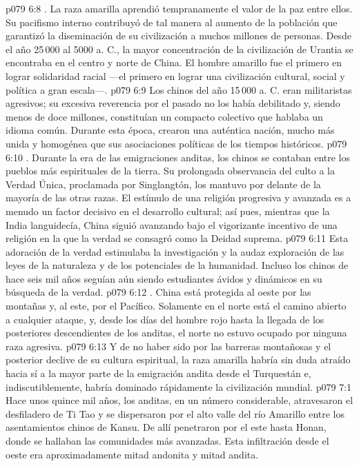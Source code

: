 \vs p079 6:8 . La raza amarilla aprendió tempranamente el valor de la paz entre ellos. Su pacifismo interno contribuyó de tal manera al aumento de la población que garantizó la diseminación de su civilización a muchos millones de personas. Desde el año 25\,000 al 5000 a. C., la mayor concentración de la civilización de Urantia se encontraba en el centro y norte de China. El hombre amarillo fue el primero en lograr solidaridad racial ---el primero en lograr una civilización cultural, social y política a gran escala---.
\vs p079 6:9 Los chinos del año 15\,000 a. C. eran militaristas agresivos; su excesiva reverencia por el pasado no los había debilitado y, siendo menos de doce millones, constituían un compacto colectivo que hablaba un idioma común. Durante esta época, crearon una auténtica nación, mucho más unida y homogénea que sus asociaciones políticas de los tiempos históricos.
\vs p079 6:10 . Durante la era de las emigraciones anditas, los chinos se contaban entre los pueblos más espirituales de la tierra. Su prolongada observancia del culto a la Verdad Única, proclamada por Singlangtón, los mantuvo por delante de la mayoría de las otras razas. El estímulo de una religión progresiva y avanzada es a menudo un factor decisivo en el desarrollo cultural; así pues, mientras que la India languidecía, China siguió avanzando bajo el vigorizante incentivo de una religión en la que la verdad se consagró como la Deidad suprema.
\vs p079 6:11 Esta adoración de la verdad estimulaba la investigación y la audaz exploración de las leyes de la naturaleza y de los potenciales de la humanidad. Incluso los chinos de hace seis mil años seguían aún siendo estudiantes ávidos y dinámicos en su búsqueda de la verdad.
\vs p079 6:12 . China está protegida al oeste por las montañas y, al este, por el Pacífico. Solamente en el norte está el camino abierto a cualquier ataque, y, desde los días del hombre rojo hasta la llegada de los posteriores descendientes de los anditas, el norte no estuvo ocupado por ninguna raza agresiva.
\vs p079 6:13 Y de no haber sido por las barreras montañosas y el posterior declive de su cultura espiritual, la raza amarilla habría sin duda atraído hacia sí a la mayor parte de la emigración andita desde el Turquestán e, indiscutiblemente, habría dominado rápidamente la civilización mundial.
\vs p079 7:1 Hace unos quince mil años, los anditas, en un número considerable, atravesaron el desfiladero de Ti Tao y se dispersaron por el alto valle del río Amarillo entre los asentamientos chinos de Kansu. De allí penetraron por el este hasta Honan, donde se hallaban las comunidades más avanzadas. Esta infiltración desde el oeste era aproximadamente mitad andonita y mitad andita.
